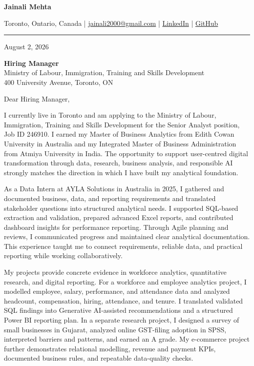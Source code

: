 \documentclass[letterpaper,10pt]{article}
\begin{document}
\begin{center}
  {\fontsize{17}{19}\selectfont\textbf{Jainali Mehta}}\par\vspace{2pt}
  \small Toronto, Ontario, Canada \;|\;
  \href{mailto:jainali2000@gmail.com}{jainali2000@gmail.com} \;|\;
  \href{https://www.linkedin.com/in/jainali-mehta}{LinkedIn} \;|\;
  \href{https://github.com/jainalimehta}{GitHub}
\end{center}
\vspace{-5pt}
\noindent\rule{\textwidth}{0.4pt}

August 2, 2026

\textbf{Hiring Manager}\\
Ministry of Labour, Immigration, Training and Skills Development\\
400 University Avenue, Toronto, ON

Dear Hiring Manager,

I currently live in Toronto and am applying to the Ministry of Labour, Immigration, Training and Skills Development for the Senior Analyst position, Job ID 246910. I earned my Master of Business Analytics from Edith Cowan University in Australia and my Integrated Master of Business Administration from Atmiya University in India. The opportunity to support user-centred digital transformation through data, research, business analysis, and responsible AI strongly matches the direction in which I have built my analytical foundation.

As a Data Intern at AYLA Solutions in Australia in 2025, I gathered and documented business, data, and reporting requirements and translated stakeholder questions into structured analytical needs. I supported SQL-based extraction and validation, prepared advanced Excel reports, and contributed dashboard insights for performance reporting. Through Agile planning and reviews, I communicated progress and maintained clear analytical documentation. This experience taught me to connect requirements, reliable data, and practical reporting while working collaboratively.

My projects provide concrete evidence in workforce analytics, quantitative research, and digital reporting. For a workforce and employee analytics project, I modelled employee, salary, performance, and attendance data and analyzed headcount, compensation, hiring, attendance, and tenure. I translated validated SQL findings into Generative AI-assisted recommendations and a structured Power BI reporting plan. In a separate research project, I designed a survey of small businesses in Gujarat, analyzed online GST-filing adoption in SPSS, interpreted barriers and patterns, and earned an A grade. My e-commerce project further demonstrates relational modelling, revenue and payment KPIs, documented business rules, and repeatable data-quality checks.
\end{document}
